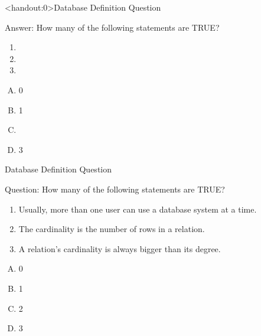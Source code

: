 \documentclass[xcolor=svgnames]{beamer}
\theoremstyle{example}
\begin{document}
\begin{frame}<handout:0>{Database Definition Question}
\begin{block}
{Answer:}
 How many of the following statements are TRUE?
\begin{enumerate}
\item {}
\item {}
\item {}
\end{enumerate}
\begin{multicols}{4}
\begin{enumerate}[A)]
\item 0 
\item 1
\item \textbf<3>{\textit<3>{{}}}
\item 3
\end{enumerate}
\end{multicols}
\end{block}
\end{frame}


\begin{frame}{Database Definition Question}
\begin{exampleblock}
{Question:}
 How many of the following statements are TRUE?
\begin{enumerate}
\item  Usually, more than one user can use a database system at a time.
\item  The cardinality is the number of rows in a relation.
\item  A relation's cardinality is always bigger than its degree.
\end{enumerate}
\begin{multicols}{4}
\begin{enumerate}[A)]
\item 0 
\item 1
\item 2
\item 3
\end{enumerate}
\end{multicols}
\end{exampleblock}
\end{frame}
\end{document}
